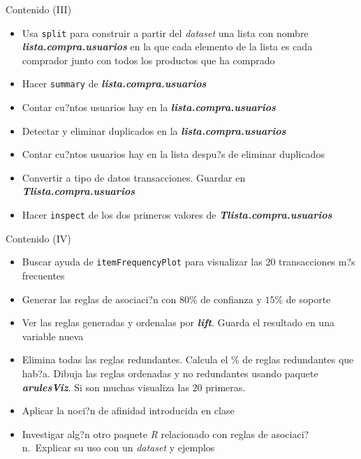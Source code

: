 \documentclass[
  ignorenonframetext,
]{beamer}
\providecommand{\tightlist}{%
  \setlength{\itemsep}{0pt}\setlength{\parskip}{0pt}}
\begin{document}
\begin{frame}[fragile]{Contenido (III)}
\protect\hypertarget{contenido-iii}{}

\begin{itemize}
\tightlist
\item
  Usa \texttt{split} para construir a partir del \emph{dataset} una
  lista con nombre \textbf{\emph{lista.compra.usuarios}} en la que cada
  elemento de la lista es cada comprador junto con todos los productos
  que ha comprado
\item
  Hacer \texttt{summary} de \textbf{\emph{lista.compra.usuarios}}
\item
  Contar cu?ntos usuarios hay en la
  \textbf{\emph{lista.compra.usuarios}}
\item
  Detectar y eliminar duplicados en la
  \textbf{\emph{lista.compra.usuarios}}
\item
  Contar cu?ntos usuarios hay en la lista despu?s de eliminar duplicados
\item
  Convertir a tipo de datos transacciones. Guardar en
  \textbf{\emph{Tlista.compra.usuarios}}
\item
  Hacer \texttt{inspect} de los dos primeros valores de
  \textbf{\emph{Tlista.compra.usuarios}}
\end{itemize}

\end{frame}

\begin{frame}[fragile]{Contenido (IV)}
\protect\hypertarget{contenido-iv}{}

\begin{itemize}
\tightlist
\item
  Buscar ayuda de \texttt{itemFrequencyPlot} para visualizar las \(20\)
  transacciones m?s frecuentes
\item
  Generar las reglas de asociaci?n con \(80\)\% de confianza y \(15\)\%
  de soporte
\item
  Ver las reglas generadas y ordenalas por \textbf{\emph{lift}}. Guarda
  el resultado en una variable nueva
\item
  Elimina todas las reglas redundantes. Calcula el \% de reglas
  redundantes que hab?a. Dibuja las reglas ordenadas y no redundantes
  usando paquete \textbf{\emph{arulesViz}}. Si son muchas visualiza las
  \(20\) primeras.
\item
  Aplicar la noci?n de afinidad introducida en clase
\item
  Investigar alg?n otro paquete \emph{R} relacionado con reglas de
  asociaci?n.~Explicar su uso con un \emph{dataset} y ejemplos
\end{itemize}

\end{frame}
\end{document}
